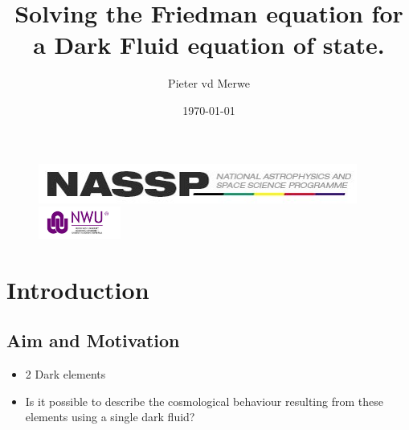\documentclass[8pt,hideothersubsections]{beamer}
\title{Solving the Friedman equation for a Dark Fluid equation of state.}
\subtitle{}
\author{Pieter vd Merwe}
\institute{North-West University Centre for Space Research}
\date{\today}
\begin{document}
\begin{frame}
\titlepage
\begin{figure}[ht]
    \begin{minipage}{0.45\linewidth}
        \centering
        \includegraphics[width=\textwidth]{./Images/NASSP_logo.jpg}
    \end{minipage}
    \begin{minipage}{0.45\linewidth}
        \centering
        \includegraphics[width=\textwidth,height=30pt]{./Images/nwu_logo.jpg}
    \end{minipage}
\end{figure}
\end{frame}

\section{Introduction}
\subsection{Aim and Motivation}
\begin{frame}
\begin{itemize}
\frametitle{\insertsectionhead}
\framesubtitle{\insertsubsectionhead}

\item 2 Dark elements\\
\hspace{2pt}


\item Is it possible to describe the cosmological behaviour resulting from these elements using a single dark fluid?\\ 



\end{itemize}
\end{frame}
\end{document}
